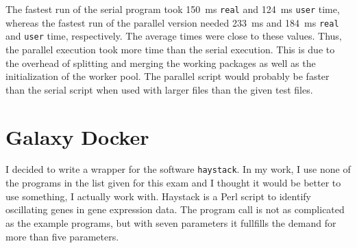 \documentclass[paper=a4, 12pt]{scrartcl}
\begin{document}
The fastest run of the serial program took 150~ms \texttt{real} and 124~ms \texttt{user} time, whereas the fastest run of the parallel version needed 233~ms and 184~ms \texttt{real} and \texttt{user} time, respectively. The average times were close to these values. Thus, the parallel execution took more time than the serial execution. This is due to the overhead of splitting and merging the working packages as well as the initialization of the worker pool. The parallel script would probably be faster than the serial script when used with larger files than the given test files.

\section{Galaxy Docker}

I decided to write a wrapper for the software \texttt{haystack}. In my work, I use none of the programs in the list given for this exam and I thought it would be better to use something, I actually work with. Haystack is a Perl script to identify oscillating genes in gene expression data. The program call is not as complicated as the example programs, but with seven parameters it fullfills the demand for more than five parameters.
\end{document}
